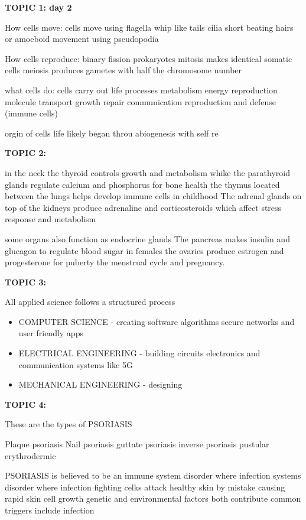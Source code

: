 {{\textbf{TOPIC 1: day 2}


How cells move:
cells move using flagella whip like tails cilia short beating hairs or amoeboid movement using pseudopodia
 


How cells reproduce:
binary fission prokaryotes 
mitosis makes identical somatic cells
meiosis produces gametes with half the chromosome number


what cells do:
cells carry out life processes 
metabolism energy reproduction molecule transport growth repair communication reproduction and defense (immune cells)


orgin of cells
life likely began throu abiogenesis with self re

\textbf{TOPIC 2:}


in the neck the thyroid controls growth and metabolism whike the parathyroid glands regulate calcium and phosphorus for bone health the thymus located between the lungs helps develop immune cells in childhood The adrenal glands on top of the kidneys produce adrenaline and corticosteroids which affect stress response and metabolism 


some organs also function as endocrine glands The pancreas makes insulin and glucagon to regulate blood sugar in females the ovaries produce estrogen and progesterone for puberty the menstrual cycle and pregnancy.

\textbf{TOPIC 3:}


All applied science follows a structured process

\begin{itemize}
    \item COMPUTER SCIENCE - creating software algorithms secure networks and user friendly apps
    \item ELECTRICAL ENGINEERING - building circuits electronics and communication systems like 5G
    \item MECHANICAL ENGINEERING - designing
\end{itemize}

\textbf{TOPIC 4:}


These are the types of PSORIASIS 


Plaque psoriasis 
Nail psoriasis 
guttate psoriasis 
inverse psoriasis 
pustular 
erythrodermic


PSORIASIS is believed to be an immune system disorder where infection systems disorder where infection fighting celks attack healthy skin by mistake causing rapid skin cell growth genetic and environmental factors both contribute common triggers include infection

}}
